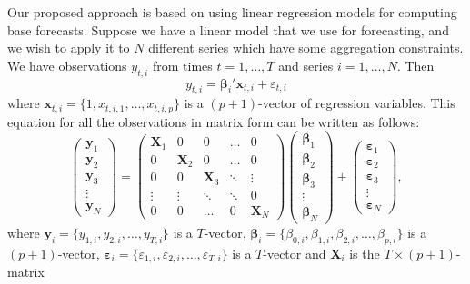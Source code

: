 \documentclass[11pt,a4paper,]{article}
\begin{document}
Our proposed approach is based on using linear regression models for computing base forecasts. Suppose we have a linear model that we use for forecasting, and we wish to apply it to \(N\) different series which have some aggregation constraints. We have observations \(y_{t,i}\) from times \(t=1,\dots,T\) and series \(i=1,\dots,N\). Then
\begin{equation}\label{eq:basicequation}
  y_{t,i} = \bm{\beta}_{i}' \bm{x}_{t,i} + \varepsilon_{t,i}
\end{equation}
where \(\bm{x}_{t,i}=\{1, x_{t,i,1},\dots,x_{t,i,p}\}\) is a \((p+1)\)-vector of regression variables. This equation for all the observations in matrix form can be written as follows:
\begin{equation}\label{eq:linearmodel}
  \begin{pmatrix}
  \bm{y}_1\\
  \bm{y}_2\\
  \bm{y}_3 \\
  \vdots\\
  \bm{y}_N
  \end{pmatrix}=
  \begin{pmatrix}
  \bm{X}_1 & 0        & 0        & \dots  & 0\\
  0        & \bm{X}_2 & 0        & \dots  & 0\\
  0        & 0        & \bm{X}_3 & \ddots & \vdots \\
  \vdots   & \vdots   & \ddots   & \ddots & 0\\
  0        & 0        & \dots    & 0      & \bm{X}_N
  \end{pmatrix}
  \begin{pmatrix}
  \bm{\beta}_1\\
  \bm{\beta}_2\\
  \bm{\beta}_3\\
  \vdots\\
  \bm{\beta}_N
  \end{pmatrix}+
  \begin{pmatrix}
  \bm{\varepsilon}_1\\
  \bm{\varepsilon}_2\\
  \bm{\varepsilon}_3\\
  \vdots \\
  \bm{\varepsilon}_N
  \end{pmatrix},
\end{equation}
where \(\bm{y}_i = \{y_{1,i}, y_{2,i}, \dots, y_{T,i}\}\) is a \(T\)-vector, \({\bm{\beta}}_i = \{\beta_{0,i}, \beta_{1,i}, \beta_{2,i}, \dots, \beta_{p,i}\}\) is a \((p+1)\)-vector, \({\bm{\varepsilon}}_i = \{\varepsilon_{1,i}, \varepsilon_{2,i}, \dots, \varepsilon_{T,i}\}\) is a \(T\)-vector and \(\bm{X}_i\) is the \(T\times (p+1)\)-matrix
\end{document}
